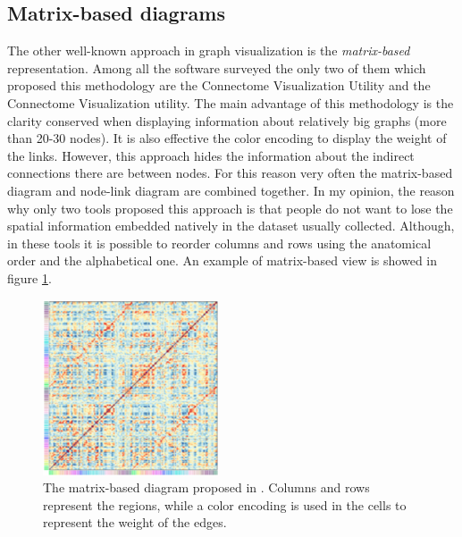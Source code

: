 \documentclass{article}
\begin{document}
\begin{multicols}{2}
\subsection{Matrix-based diagrams}
\label{subsec:matrixbased}
The other well-known approach in graph visualization is the \textit{matrix-based} representation. Among all the software surveyed the only two of them which proposed this methodology are the Connectome Visualization Utility and the Connectome Visualization utility. The main advantage of this methodology is the clarity conserved when displaying information about relatively big graphs (more than 20-30 nodes). It is also effective the color encoding to display the weight of the links. However, this approach hides the information about the indirect connections there are between nodes. For this reason very often the matrix-based diagram and node-link diagram are combined together. In my opinion, the reason why only two tools proposed this approach is that people do not want to lose the spatial information embedded natively in the dataset usually collected. Although, in these tools it is possible to reorder columns and rows using the anatomical order and the alphabetical one. An example of matrix-based view is showed in figure \ref{fig:matrix}.
\begin{figure}[H]
\centering
\includegraphics[width = 0.9\columnwidth]{matrix}
\caption{The matrix-based diagram proposed in \cite{connectomeVisualizationUtility}. Columns and rows represent the regions, while a color encoding is used in the cells to represent the weight of the edges.}
\label{fig:matrix}
\end{figure}



\end{multicols}
\end{document}
